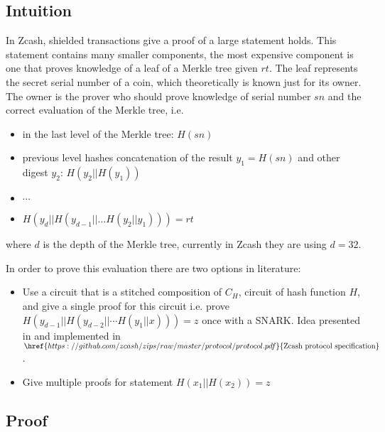 \subsection{Intuition}

In Zcash, shielded transactions give a proof of a large statement holds. This statement contains many smaller components, the most expensive component is one that proves knowledge of a leaf of a Merkle tree given $rt$. The leaf represents the secret serial number of a coin, which theoretically is known just for its owner. The owner is the prover who should prove knowledge of serial number $sn$ and the correct evaluation of the Merkle tree, i.e.
\begin{itemize}
	\item in the last level of the Merkle tree: $H(sn)$
	\item previous level hashes concatenation of the result $y_1=H(sn)$ and other digest $y_2$: $H(y_2||H(y_1))$
	\item $\cdots$
	\item $H(y_{d} || H(y_{d-1} || \dots H(y_2||y_1))) = rt$
\end{itemize}
where $d$ is the depth of the Merkle tree, currently in Zcash they are using $d=32$.

In order to prove this evaluation there are two options in literature:
\begin{itemize}
	\item Use a circuit that is a stitched composition of $C_H$, circuit of hash function $H$, and give a single proof for this circuit i.e. prove $H(y_{d-1}||H(y_{d-2}|| \cdots H(y_1||x)))=z$ once with a SNARK. Idea presented in \cite{SP:BCGGMT14} and implemented in $\href{https://github.com/zcash/zips/raw/master/protocol/protocol.pdf}{\text{Zcash protocol specification}}$.
	\item Give multiple proofs for statement $H(x_1||H(x_2))=z$
\end{itemize}
\subsection{Proof}